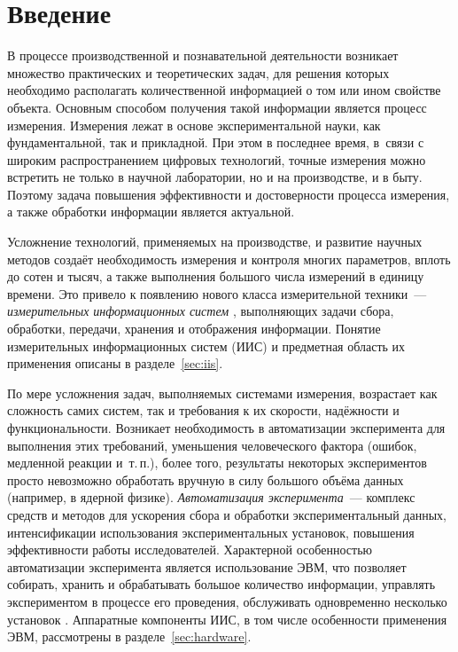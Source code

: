 \documentclass[a4paper, 14pt, titlepage]{extarticle}
\newcounter{firstpage}
\newcommand\firstPageHere{\setcounter{firstpage}{\value{page}}}
\newcommand\sectiontoc[1]{\section*{\centering #1}\addcontentsline{toc}{section}{#1}}
\newcommand{\term}[1]{\emph{#1}}
\let\oldsection\section
\renewcommand{\section}{\newpage\oldsection}
\begin{document}
  \firstPageHere
  \sectiontoc{Введение}\label{sec:intro}

  В процессе производственной и познавательной деятельности возникает множество практических и
  теоретических задач, для решения которых необходимо располагать количественной информацией о том
  или ином свойстве объекта. Основным способом получения такой информации является процесс измерения.
  Измерения лежат в основе экспериментальной науки, как фундаментальной, так и прикладной. При этом
  в последнее время, в~связи с широким распространением цифровых технологий, точные измерения можно
  встретить не только в научной лаборатории, но и на производстве, и в быту.
  Поэтому задача повышения эффективности и достоверности процесса измерения, а также обработки информации
  является актуальной.

  Усложнение технологий, применяемых на производстве, и развитие научных методов создаёт
  необходимость измерения и контроля многих параметров, вплоть до сотен и тысяч, а также
  выполнения большого числа измерений в единицу времени. Это привело к появлению нового класса
  измерительной техники~--- \term{измерительных информационных систем} \cite{rannev-iis,rannev-meas-tech},
  выполняющих задачи сбора, обработки, передачи, хранения и отображения информации.
  Понятие измерительных информационных систем (ИИС) и предметная область их применения описаны в
  разделе~\ref{sec:iis}.

  По мере усложнения задач, выполняемых системами измерения, возрастает как сложность самих систем,
  так и требования к их скорости, надёжности и функциональности. Возникает необходимость в
  автоматизации эксперимента для выполнения этих требований, уменьшения человеческого фактора
  (ошибок, медленной реакции и~т.\,п.), более того, результаты некоторых экспериментов просто
  невозможно обработать вручную в силу большого объёма данных (например, в ядерной физике).
  \term{Автоматизация эксперимента}~--- комплекс
  средств и методов для ускорения сбора и обработки экспериментальный данных, интенсификации
  использования экспериментальных установок, повышения эффективности работы исследователей.
  Характерной особенностью автоматизации эксперимента является использование ЭВМ, что позволяет
  собирать, хранить и обрабатывать большое количество информации, управлять экспериментом в процессе
  его проведения, обслуживать одновременно несколько установок \cite{petronevich-automation,sokolov-auto-measure}.
  Аппаратные компоненты ИИС, в том числе особенности применения ЭВМ, рассмотрены в
  разделе~\ref{sec:hardware}.
\end{document}
